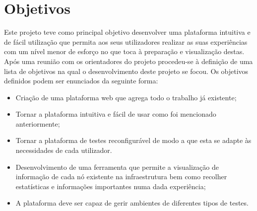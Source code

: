 \section{Objetivos}
Este projeto teve como principal objetivo desenvolver uma plataforma intuitiva e de fácil utilização que permita aos seus utilizadores realizar as suas experiências com um nível menor de esforço no que toca à preparação  e  visualização destas.\newline
Após uma reunião com os orientadores do projeto procedeu-se à definição de uma lista de objetivos na qual o desenvolvimento deste projeto se focou. Os objetivos definidos podem ser enunciados da seguinte forma:
\begin{itemize}
    \item Criação de uma plataforma web que agrega todo o trabalho já existente;
    \item Tornar a plataforma intuitiva e fácil de usar como foi mencionado anteriormente;
    \item Tornar a plataforma de testes reconfigurável de modo a que esta se adapte às necessidades de cada utilizador.
    \item Desenvolvimento de uma ferramenta que permite a visualização de informação de cada nó existente na infraestrutura bem como recolher estatísticas e informações importantes numa dada experiência;
    \item A plataforma deve ser capaz de gerir ambientes de diferentes tipos de testes.
\end{itemize}

